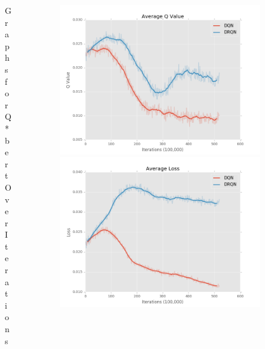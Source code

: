 \documentclass[final]{beamer}
\newlength{\onecolwid}
\newlength{\twocolwid}
\begin{document}
\begin{frame}[t]
\begin{columns}[t]
\begin{column}{\twocolwid}
\begin{columns}[t,totalwidth=\twocolwid]
\begin{column}{\onecolwid}
\begin{figure}[h]
\begin{minipage}{1.0\textwidth}
    \end{minipage}
    \caption{Graphs for Q*bert Over Iterations}
\end{figure}


\end{column} %


\begin{column}{\onecolwid} %

\begin{figure}[h]
    \centering
    \begin{minipage}{1.0\textwidth}
        \centering
        \includegraphics[scale=0.45]{Seaquest-DQN_vs_DRQN1.png}
        \centering
        \includegraphics[scale=0.45]{Seaquest-DQN_vs_DRQN2.png}

\end{minipage}
\end{figure}
\end{column}
\end{columns}
\end{column}
\end{columns}
\end{frame}
\end{document}
